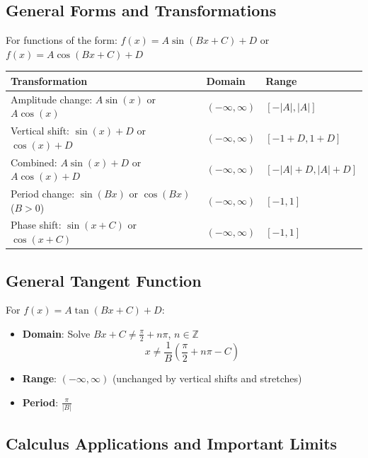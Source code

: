 \documentclass[../main-notes.tex]{subfile}
\begin{document}
\newpage

\subsection*{General Forms and Transformations}

For functions of the form: \( f(x) = A \sin(Bx + C) + D \) or \( f(x) = A \cos(Bx + C) + D \)

\begin{table}[h]
\centering
\renewcommand{\arraystretch}{1.5}
\begin{tabular}{@{}lll@{}}
\toprule
\textbf{Transformation} & \textbf{Domain} & \textbf{Range} \\ 
\midrule
Amplitude change: \( A\sin(x) \) or \( A\cos(x) \) & \( (-\infty, \infty) \) & \( [-|A|, |A|] \) \\
Vertical shift: \( \sin(x) + D \) or \( \cos(x) + D \) & \( (-\infty, \infty) \) & \( [-1 + D, 1 + D] \) \\
Combined: \( A\sin(x) + D \) or \( A\cos(x) + D \) & \( (-\infty, \infty) \) & \( [-|A| + D, |A| + D] \) \\
Period change: \( \sin(Bx) \) or \( \cos(Bx) \) (\( B > 0 \)) & \( (-\infty, \infty) \) & \( [-1, 1] \) \\
Phase shift: \( \sin(x + C) \) or \( \cos(x + C) \) & \( (-\infty, \infty) \) & \( [-1, 1] \) \\
\bottomrule
\end{tabular}
\end{table}

\subsection*{General Tangent Function}

For \( f(x) = A \tan(Bx + C) + D \):
\begin{itemize}
    \item \textbf{Domain}: Solve \( Bx + C \neq \frac{\pi}{2} + n\pi \), \( n \in \mathbb{Z} \)
    \[
    x \neq \frac{1}{B}\left(\frac{\pi}{2} + n\pi - C\right)
    \]
    \item \textbf{Range}: \( (-\infty, \infty) \) (unchanged by vertical shifts and stretches)
    \item \textbf{Period}: \( \frac{\pi}{|B|} \)
\end{itemize}

\subsection*{Calculus Applications and Important Limits}
\end{document}

